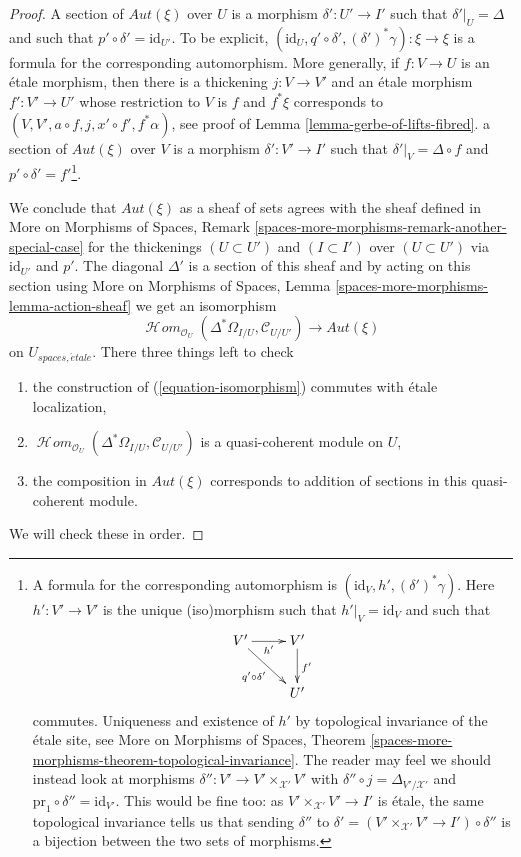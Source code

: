 \documentclass{stacks-project}
\theoremstyle{plain}
\theoremstyle{definition}
\theoremstyle{remark}
\numberwithin{equation}{subsection}
\def\SheafHom{\mathop{\mathcal{H}\!\mathit{om}}\nolimits}
\def\etale{{\acute{e}tale}}
\begin{document}
\begin{proof}
\medskip\noindent
A section of $\mathit{Aut}(\xi)$ over $U$ is a morphism $\delta' : U' \to I'$
such that $\delta'|_U = \Delta$ and such that
$p' \circ \delta' = \text{id}_{U'}$. To be explicit,
$(\text{id}_U, q' \circ \delta', (\delta')^*\gamma) : \xi \to \xi$
is a formula for the corresponding automorphism.
More generally, if
$f : V \to U$ is an \'etale morphism, then there is a thickening
$j : V \to V'$ and an \'etale morphism
$f' : V' \to U'$ whose restriction to $V$ is $f$ and $f^*\xi$
corresponds to $(V, V', a \circ f, j, x' \circ f', f^*\alpha)$, see proof of
Lemma \ref{lemma-gerbe-of-lifts-fibred}.
 a section of $\mathit{Aut}(\xi)$ over $V$ is a morphism
$\delta' : V' \to I'$
such that $\delta'|_V = \Delta \circ f$
and $p' \circ \delta' = f'$\footnote{A formula for the corresponding
automorphism is $(\text{id}_V, h', (\delta')^*\gamma)$.
Here $h' : V' \to V'$ is the unique (iso)morphism such that
$h'|_V = \text{id}_V$ and such that
$$
\xymatrix{
V' \ar[r]_{h'} \ar[rd]_{q' \circ \delta'} & V' \ar[d]^{f'} \\
& U'
}
$$
commutes. Uniqueness and existence of $h'$ by topological invariance of
the \'etale site, see More on Morphisms of Spaces,
Theorem \ref{spaces-more-morphisms-theorem-topological-invariance}.
The reader may feel we should instead look at morphisms
$\delta'' : V' \to V' \times_{\mathcal{X}'} V'$ with
$\delta'' \circ j = \Delta_{V'/\mathcal{X}'}$ and
$\text{pr}_1 \circ \delta'' = \text{id}_{V'}$.
This would be fine too: as $V' \times_{\mathcal{X}'} V' \to I'$ is \'etale,
the same topological invariance tells us that sending
$\delta''$ to $\delta' = (V' \times_{\mathcal{X}'} V' \to I') \circ \delta''$
is a bijection between the two
sets of morphisms.}.

\medskip\noindent
We conclude that $\mathit{Aut}(\xi)$ as a sheaf of sets agrees with
the sheaf defined in
More on Morphisms of Spaces, Remark
\ref{spaces-more-morphisms-remark-another-special-case}
for the thickenings $(U \subset U')$ and $(I \subset I')$ over
$(U \subset U')$ via $\text{id}_{U'}$ and $p'$.
The diagonal $\Delta'$ is a section of this sheaf and by
acting on this section using More on Morphisms of Spaces, Lemma
\ref{spaces-more-morphisms-lemma-action-sheaf}
we get an isomorphism
\begin{equation}
\label{equation-isomorphism}
\SheafHom_{\mathcal{O}_U}(\Delta^*\Omega_{I/U}, \mathcal{C}_{U/U'})
\longrightarrow
\mathit{Aut}(\xi)
\end{equation}
on $U_{spaces, \etale}$. There three things left to check
\begin{enumerate}
\item the construction of (\ref{equation-isomorphism})
commutes with \'etale localization,
\item $\SheafHom_{\mathcal{O}_U}(\Delta^*\Omega_{I/U}, \mathcal{C}_{U/U'})$
is a quasi-coherent module on $U$,
\item the composition in $\mathit{Aut}(\xi)$ corresponds
to addition of sections in this quasi-coherent module.
\end{enumerate}
We will check these in order.


\end{proof}
\end{document}
